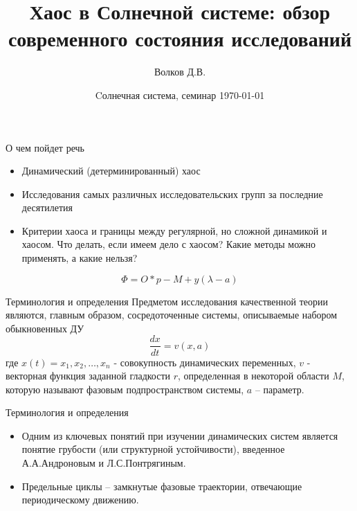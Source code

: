 \documentclass{beamer}
\begin{document}
\title{Хаос в Солнечной системе: \linebreak обзор современного состояния исследований}  
\author{Волков Д.В.}
\date{Cолнечная система, семинар \today} 
\frame{\titlepage} 

\begin{frame}{О чем пойдет речь}
        \begin{itemize}
		\item Динамический (детерминированный) хаос 
		\item Исследования самых различных исследовательских групп за последние десятилетия 
		\item Критерии хаоса и границы между регулярной, но сложной динамикой и хаосом. Что делать, если имеем дело с хаосом? Какие методы можно применять, а какие нельзя?
	\end{itemize}

	\begin{equation}
		\Phi = O * p - M + y (\lambda - a)
	\end{equation}
\end{frame}

\begin{frame}{Терминология и определения}
Предметом исследования качественной теории являются, главным образом, сосредоточенные системы, описываемые набором обыкновенных ДУ
\begin{equation}
        \frac{dx}{dt} = v(x, a)
\end{equation}
где $x(t) = {x_1, x_2, \ldots, x_n}$ - совокупность динамических переменных, $v$ - векторная функция заданной гладкости $r$, определенная в некоторой области $M$, которую называют фазовым подпространством системы, $a$ -- параметр.
\end{frame}


\begin{frame}{Терминология и определения}
\begin{itemize}
        \item        Одним из ключевых понятий при изучении динамических систем является понятие грубости (или структурной устойчивости), введенное А.А.Андроновым и Л.С.Понтрягиным. 
        \item Предельные циклы -- замкнутые фазовые траектории, отвечающие периодическому движению.

\end{itemize}
\end{frame}
\end{document}
